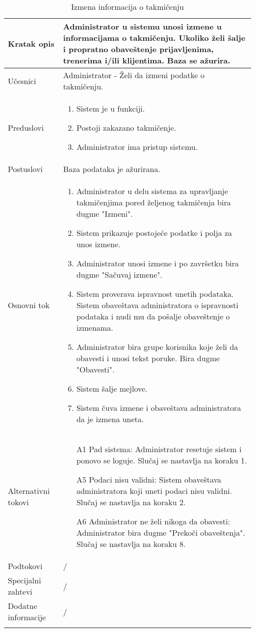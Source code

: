 \documentclass[../../main.tex]{subfiles}
\begin{document}
\begin{longtable}{| p{} | p{} |} 
\hline
    Kratak opis &  Administrator u sistemu unosi izmene u informacijama o takmičenju. Ukoliko želi šalje i propratno obaveštenje prijavljenima, trenerima i/ili klijentima. Baza se ažurira.\\ 
\hline    
    Učesnici & Administrator - Želi da izmeni podatke o takmičenju. \\
\hline
   Preduslovi & \begin{enumerate}
       \item Sistem je u funkciji.
       \item Postoji zakazano takmičenje.
       \item Administrator ima pristup sistemu.
   \end{enumerate}\\
\hline  
    Postuslovi & Baza podataka je ažurirana.\\
\hline
    Osnovni tok & \begin{enumerate}
        \item Administrator u delu sistema za upravljanje takmičenjima pored željenog takmičenja bira dugme "Izmeni".
        \item Sistem prikazuje postojeće podatke i polja za unos izmene.
        \item Administrator unosi izmene i po završetku bira dugme "Sačuvaj izmene".
        \item Sistem proverava ispravnost unetih podataka. Sistem obaveštava administratora o ispravnosti podataka i nudi mu da pošalje obaveštenje o izmenama.
        \item Administrator bira grupe korisnika koje želi da obavesti i unosi tekst poruke. Bira dugme "Obavesti".
        \item Sistem šalje mejlove. 
        \item Sistem čuva izmene i obaveštava administratora da je izmena uneta.
    \end{enumerate}\\
\hline
    Alternativni tokovi & \begin{itemize}
        \item[A1] Pad sistema: Administrator resetuje sistem i ponovo se loguje. Slučaj se nastavlja na koraku 1.
        \item[A5] Podaci nisu validni: Sistem obaveštava administratora koji uneti podaci nisu validni. Slučaj se nastavlja na koraku 2.
        \item[A6] Administrator ne želi nikoga da obavesti: Administrator bira dugme "Prekoči obaveštenja". Slučaj se nastavlja na koraku 8.
    \end{itemize}\\
\hline
    Podtokovi & /\\
\hline
    Specijalni zahtevi & /\\
\hline
    Dodatne informacije & /\\
\hline
\caption{Izmena informacija o takmičenju} %
\end{longtable}
\end{document}

